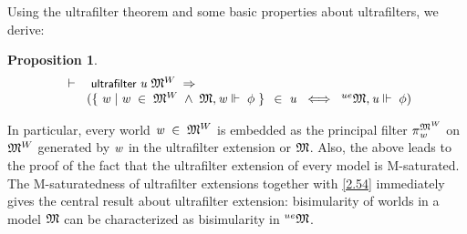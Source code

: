 \documentclass{llncs}
\newtheorem{prop}[thm]{Proposition}
\newenvironment{holmath}{\begin{displaymath}\begin{array}{l}}{\end{array}\end{displaymath}\ignorespacesafterend}
\renewcommand{\HOLConst}[1]{{\textsf{\upshape\small #1}}}
\renewcommand{\HOLinline}[1]{\ensuremath{#1}}
\renewcommand{\HOLTokenBar}{\mbox{$|$}}
\begin{document}
Using the ultrafilter theorem and some basic properties about ultrafilters, we derive:
 \begin{prop}\label{2.59}
{\upshape\cite[Proposition 2.59 (i)]{Blackburn}}
\begin{holmath}
  \ensuremath{\HOLTokenTurnstile}\HOLConst{ultrafilter}\;\HOLFreeVar{u}\;\HOLFreeVar{\ensuremath{\mathfrak{M}}}\HOLSymConst{\ensuremath{\sp{W}}}\;\HOLSymConst{\HOLTokenImp{}}\\
\;\;\;\;\;\;\;(\HOLTokenLeftbrace{}\HOLBoundVar{w}\;\HOLTokenBar{}\;\HOLBoundVar{w}\;\HOLSymConst{\HOLTokenIn{}}\;\HOLFreeVar{\ensuremath{\mathfrak{M}}}\HOLSymConst{\ensuremath{\sp{W}}}\;\HOLSymConst{\HOLTokenConj{}}\;\HOLFreeVar{\ensuremath{\mathfrak{M}}},\HOLBoundVar{w}\ensuremath{\Vdash}\;\HOLFreeVar{\ensuremath{\phi}}\HOLTokenRightbrace{}\;\HOLSymConst{\HOLTokenIn{}}\;\HOLFreeVar{u}\;\HOLSymConst{\HOLTokenEquiv{}}\;{}\sp{ue}{\HOLFreeVar{\ensuremath{\mathfrak{M}}}},\HOLFreeVar{u}\ensuremath{\Vdash}\;\HOLFreeVar{\ensuremath{\phi}})
\end{holmath}
\end{prop}
In particular, every world \HOLinline{\HOLFreeVar{w}\;\HOLSymConst{\HOLTokenIn{}}\;\HOLFreeVar{\ensuremath{\mathfrak{M}}}\HOLSymConst{\ensuremath{\sp{W}}}} is embedded as the principal filter \HOLinline{\pi\sb{\HOLFreeVar{w}}\sp{\HOLFreeVar{\ensuremath{\mathfrak{M}}}\HOLSymConst{\ensuremath{\sp{W}}}}} on \HOLinline{\HOLFreeVar{\ensuremath{\mathfrak{M}}}\HOLSymConst{\ensuremath{\sp{W}}}} generated by \HOLinline{\HOLFreeVar{w}} in the ultrafilter extension or \HOLinline{\HOLFreeVar{\ensuremath{\mathfrak{M}}}}. Also, the above leads to the proof of the fact that the ultrafilter extension of every model is M-saturated. The M-saturatedness of ultrafilter extensions together with \ref{2.54} immediately gives the central result about ultrafilter extension: bisimularity of worlds in a model \HOLinline{\HOLFreeVar{\ensuremath{\mathfrak{M}}}} can be characterized as bisimularity in \HOLinline{{}\sp{ue}{\HOLFreeVar{\ensuremath{\mathfrak{M}}}}}. 
\end{document}
